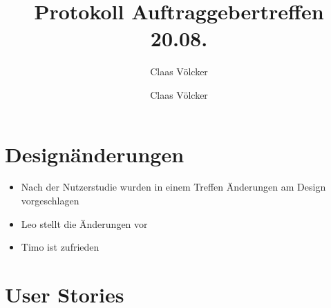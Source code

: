 \documentclass[colorback, accentcolor=tud1c, paper=a4]{tudexercise}
\title{Protokoll Auftraggebertreffen 20.08.}
\subtitle{Claas Völcker}
\author{Claas Völcker}
\begin{document}
\maketitle

\section*{Designänderungen}
\begin{itemize}
	\item Nach der Nutzerstudie wurden in einem Treffen Änderungen am Design vorgeschlagen
	\item Leo stellt die Änderungen vor
	\item Timo ist zufrieden
\end{itemize}

\section*{User Stories}
\end{document}
